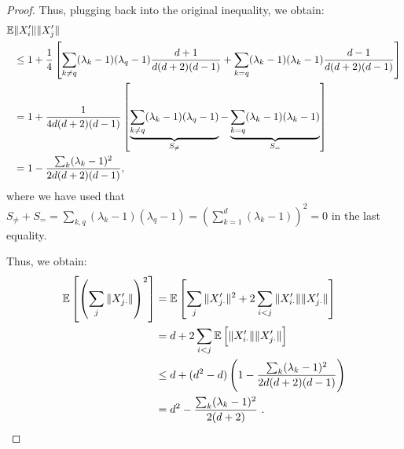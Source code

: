 \begin{proof}
Thus, plugging back into the original inequality, we obtain:
\begin{align}
    \mathbb{E} &\| X'_i \| \| X'_j\| \\
    &\leq 1+\frac{1}{4} \left[ \sum_{k \neq q} (\lambda_k-1)(\lambda_q -1) \frac{d+1}{d(d+2)(d-1)} + \sum_{k=q} (\lambda_k-1)(\lambda_k-1) \frac{d-1}{d(d+2)(d-1)} \right] \\
    &= 1+\frac{1}{4d(d+2)(d-1)} \left[ \underbrace{\sum_{k \neq q} (\lambda_k-1)(\lambda_q -1)}_{S_{\neq}} - \underbrace{\sum_{k=q} (\lambda_k-1)(\lambda_k-1)}_{S_=} \right] \\
    &= 1 - \frac{\sum_k(\lambda_k - 1)^2}{2d(d+2)(d-1)},
\end{align}
where we have used that $S_{\neq} + S_= = \sum_{k,q}(\lambda_k-1)(\lambda_q -1) = (\sum_{k=1}^d (\lambda_k-1))^2=0$ in the last equality.

Thus, we obtain:
\begin{align}
    \mathbb{E} \left[ \left(\sum_j \| X'_{j\cdot} \| \right)^2 \right]
    &= \mathbb{E} \left[ \sum_j \| X_{j\cdot}' \|^2 + 2 \sum_{i < j} \| X'_{i\cdot} \| \| X'_{j\cdot} \| \right] \\
    &= d + 2 \sum_{i < j} \mathbb{E} \left[ \| X'_{i\cdot} \| \| X'_{j\cdot} \| \right] \\
    &\leq d + (d^2 - d)\left( 1 - \frac{\sum_k(\lambda_k - 1)^2}{2d(d+2)(d-1)} \right) \\
    &= d^2 - \frac{\sum_k(\lambda_k - 1)^2}{2(d+2)} \label{grad:eq:bound}~.
\end{align}
\end{proof}

